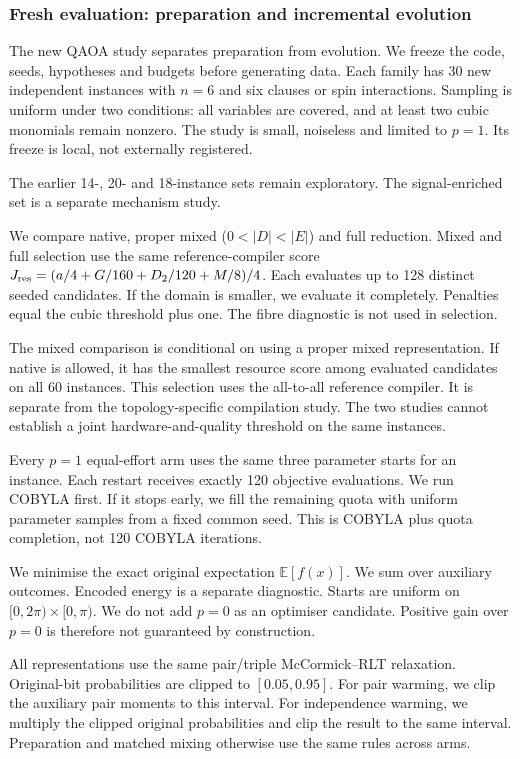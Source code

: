 \documentclass[a4paper,onecolumn,11pt,unpublished]{quantumarticle}
\theoremstyle{remark}
\begin{document}
\subsubsection{Fresh evaluation: preparation and incremental evolution}

\label{sec:fresh-qaoa}

The new QAOA study separates preparation from evolution.
We freeze the code, seeds, hypotheses and budgets before generating data.
Each family has 30 new independent instances with $n=6$ and six clauses
or spin interactions. Sampling is uniform under two conditions: all variables
are covered, and at least two cubic monomials remain nonzero.
The study is small, noiseless and limited to $p=1$.
Its freeze is local, not externally registered.

The earlier 14-, 20- and 18-instance sets remain exploratory.
The signal-enriched set is a separate mechanism study.

We compare native, proper mixed ($0<|D|<|E|$) and full reduction.
Mixed and full selection use the same reference-compiler score
$J_{\rm res}=(a/4+G/160+D_2/120+M/8)/4$.
Each evaluates up to 128 distinct seeded candidates. If the domain is
smaller, we evaluate it completely. Penalties equal the cubic threshold
plus one. The fibre diagnostic is not used in selection.

The mixed comparison is conditional on using a proper mixed representation.
If native is allowed, it has the smallest resource score among evaluated
candidates on all 60 instances.
This selection uses the all-to-all reference compiler. It is separate from
the topology-specific compilation study. The two studies cannot establish
a joint hardware-and-quality threshold on the same instances.

Every $p=1$ equal-effort arm uses the same three parameter starts for an
instance. Each restart receives exactly 120 objective evaluations.
We run COBYLA first. If it stops early, we fill the remaining quota with
uniform parameter samples from a fixed common seed.
This is COBYLA plus quota completion, not 120 COBYLA iterations.

We minimise the exact original expectation $\mathbb E[f(x)]$.
We sum over auxiliary outcomes. Encoded energy is a separate diagnostic.
Starts are uniform on $[0,2\pi)\times[0,\pi)$.
We do not add $p=0$ as an optimiser candidate. Positive gain over $p=0$
is therefore not guaranteed by construction.

All representations use the same pair/triple McCormick--RLT relaxation.
Original-bit probabilities are clipped to $[0.05,0.95]$.
For pair warming, we clip the auxiliary pair moments to this interval.
For independence warming, we multiply the clipped original probabilities
and clip the result to the same interval.
Preparation and matched mixing otherwise use the same rules across arms.
\end{document}
